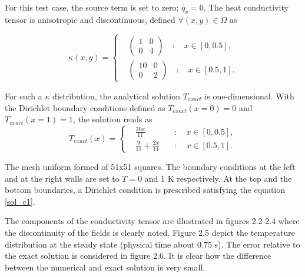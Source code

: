For this test case, the source term is set to zero; $\dot{q_v}=0$. The heat conductivity tensor is anisotropic and discontinuous, defined $\forall (x,y)\in \Omega$ as 

\begin{equation}\label{tensor_c1}
\kappa(x,y)=
\left\{
\begin{aligned}
&\displaystyle\left(\begin{matrix} 1 & 0 \\ 0 & 4 \end{matrix}\right) \quad : \quad x\in[0,0.5], \\
&\displaystyle\left(\begin{matrix} 10 & 0 \\ 0 & 2 \end{matrix}    \right) \quad : \quad x\in[0.5,1].
\end{aligned}
\right.
\end{equation}

For such a $\kappa$ distribution, the analytical solution $T_{exact}$ is one-dimensional. With the Dirichlet boundary conditions defined as $T_{exact}(x=0)=0$ and $T_{exact}(x=1)=1$, the solution reads as
\begin{equation}\label{sol_c1}
T_{exact}(x)=\left\{
\begin{aligned}
&\displaystyle \frac{20x}{11} \quad &: \quad x\in[0,0.5], \\
&\displaystyle\frac{9}{11} + \frac{2x}{11}\quad &: \quad x\in[0.5,1].
\end{aligned}
\right.
\end{equation}

The mesh uniform formed of 51x51 squares.  The boundary conditions at the left and at the right walls are set to $T=0$ and 1 K respectively. At the top and the bottom boundaries, a Dirichlet condition is prescribed satisfying the equation \eqref{sol_c1}.

The components of the conductivity tensor are illustrated in figures 2.2-2.4 where the discontinuity of the fields is clearly noted. Figure 2.5 depict the temperature distribution at the steady state (physical time about 0.75 s). The error relative to the exact solution is considered in figure 2.6.  It is clear how the difference between the numerical and exact solution is very small. 


